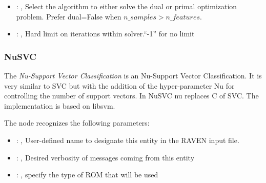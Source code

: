 \begin{itemize}
    \item {}: , 
      Select the algorithm to either solve the dual or primal optimization problem.
      Prefer dual=False when $n\_samples > n\_features$.

    \item {}: , 
      Hard limit on iterations within solver.``-1'' for no limit
  \end{itemize}


\subsubsection{NuSVC}
  The  \textit{Nu-Support Vector Classification} is an Nu-Support Vector
  Classification.                             It is very similar to SVC but with the addition of the
  hyper-parameter Nu for controlling the                             number of support vectors. In
  NuSVC nu replaces C of SVC.                             The implementation is based on libsvm.

  The  node recognizes the following parameters:
    \begin{itemize}
      \item {}: , 
        User-defined name to designate this entity in the RAVEN input file.
      \item {}: , 
        Desired verbosity of messages coming from this entity
      \item {}: , 
        specify the type of ROM that will be used
  \end{itemize}

